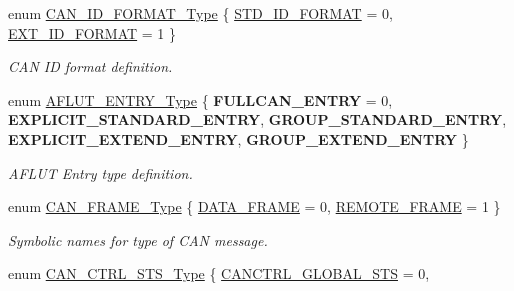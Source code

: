 \begin{DoxyCompactItemize}
\item 
enum \hyperlink{group___c_a_n___public___types_gab5c597672ab7b26c153bcaeda4828e37}{\-C\-A\-N\-\_\-\-I\-D\-\_\-\-F\-O\-R\-M\-A\-T\-\_\-\-Type} \{ \hyperlink{group___c_a_n___public___types_ggab5c597672ab7b26c153bcaeda4828e37afa259432f5255caea8a3fabc42c61efe}{\-S\-T\-D\-\_\-\-I\-D\-\_\-\-F\-O\-R\-M\-A\-T} =  0, 
\hyperlink{group___c_a_n___public___types_ggab5c597672ab7b26c153bcaeda4828e37a41ea63173c3b09052bc8882bb7a36d39}{\-E\-X\-T\-\_\-\-I\-D\-\_\-\-F\-O\-R\-M\-A\-T} =  1
 \}
\begin{DoxyCompactList}\small\item\em \-C\-A\-N \-I\-D format definition. \end{DoxyCompactList}\item 
enum \hyperlink{group___c_a_n___public___types_gadf681942f2c313b94d483bf0f31f7a55}{\-A\-F\-L\-U\-T\-\_\-\-E\-N\-T\-R\-Y\-\_\-\-Type} \{ \*
{\bfseries \-F\-U\-L\-L\-C\-A\-N\-\_\-\-E\-N\-T\-R\-Y} =  0, 
{\bfseries \-E\-X\-P\-L\-I\-C\-I\-T\-\_\-\-S\-T\-A\-N\-D\-A\-R\-D\-\_\-\-E\-N\-T\-R\-Y}, 
{\bfseries \-G\-R\-O\-U\-P\-\_\-\-S\-T\-A\-N\-D\-A\-R\-D\-\_\-\-E\-N\-T\-R\-Y}, 
{\bfseries \-E\-X\-P\-L\-I\-C\-I\-T\-\_\-\-E\-X\-T\-E\-N\-D\-\_\-\-E\-N\-T\-R\-Y}, 
\*
{\bfseries \-G\-R\-O\-U\-P\-\_\-\-E\-X\-T\-E\-N\-D\-\_\-\-E\-N\-T\-R\-Y}
 \}
\begin{DoxyCompactList}\small\item\em \-A\-F\-L\-U\-T \-Entry type definition. \end{DoxyCompactList}\item 
enum \hyperlink{group___c_a_n___public___types_ga8f522a08d7a773754ac6c4f54fae0711}{\-C\-A\-N\-\_\-\-F\-R\-A\-M\-E\-\_\-\-Type} \{ \hyperlink{group___c_a_n___public___types_gga8f522a08d7a773754ac6c4f54fae0711a4e9747725fb8de6f722482aeedfb8cbb}{\-D\-A\-T\-A\-\_\-\-F\-R\-A\-M\-E} =  0, 
\hyperlink{group___c_a_n___public___types_gga8f522a08d7a773754ac6c4f54fae0711a2ff651f1e7a30143f1aaa0d2f26035fe}{\-R\-E\-M\-O\-T\-E\-\_\-\-F\-R\-A\-M\-E} =  1
 \}
\begin{DoxyCompactList}\small\item\em \-Symbolic names for type of \-C\-A\-N message. \end{DoxyCompactList}\item 
enum \hyperlink{group___c_a_n___public___types_gafd4d389b789aeffd24d3d164d45026cf}{\-C\-A\-N\-\_\-\-C\-T\-R\-L\-\_\-\-S\-T\-S\-\_\-\-Type} \{ \hyperlink{group___c_a_n___public___types_ggafd4d389b789aeffd24d3d164d45026cfac60043d26a961762947d70becdee09dd}{\-C\-A\-N\-C\-T\-R\-L\-\_\-\-G\-L\-O\-B\-A\-L\-\_\-\-S\-T\-S} =  0, 

\end{DoxyCompactItemize}
